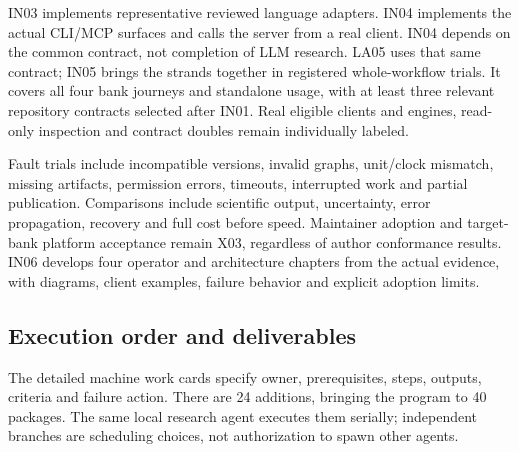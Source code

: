 \documentclass[
  11pt,
  a4paper,
]{article}
\begin{document}
IN03 implements representative reviewed language adapters. IN04
implements the actual CLI/MCP surfaces and calls the server from a real
client. IN04 depends on the common contract, not completion of LLM
research. LA05 uses that same contract; IN05 brings the strands together
in registered whole-workflow trials. It covers all four bank journeys
and standalone usage, with at least three relevant repository contracts
selected after IN01. Real eligible clients and engines, read-only
inspection and contract doubles remain individually labeled.

Fault trials include incompatible versions, invalid graphs, unit/clock
mismatch, missing artifacts, permission errors, timeouts, interrupted
work and partial publication. Comparisons include scientific output,
uncertainty, error propagation, recovery and full cost before speed.
Maintainer adoption and target-bank platform acceptance remain X03,
regardless of author conformance results. IN06 develops four operator
and architecture chapters from the actual evidence, with diagrams,
client examples, failure behavior and explicit adoption limits.

\hypertarget{execution-order-and-deliverables}{%
\subsection{Execution order and
deliverables}\label{execution-order-and-deliverables}}

The detailed machine work cards specify owner, prerequisites, steps,
outputs, criteria and failure action. There are 24 additions, bringing
the program to 40 packages. The same local research agent executes them
serially; independent branches are scheduling choices, not authorization
to spawn other agents.
\end{document}
